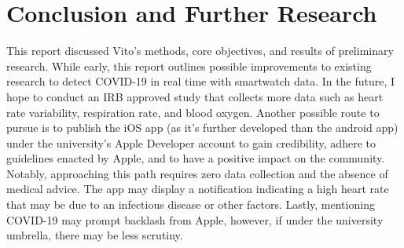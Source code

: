 \documentclass{article}
\newcommand\todo[1]{\textcolor{blue}{#1}}
\begin{document}

\section{Conclusion and Further Research}
 This report discussed Vito's methods, core objectives, and results of preliminary research.  While early, this report outlines possible improvements to existing research to detect COVID-19 in real time with smartwatch data.  In the future, I hope to conduct an IRB approved study that collects more data such as heart rate variability, respiration rate, and blood oxygen.  Another possible route to pursue is to publish the iOS app (as it's further developed than the android app) under the university's Apple Developer account to gain credibility, adhere to guidelines enacted by Apple, and to have a positive impact on the community.  Notably, approaching this path requires zero data collection and the absence of medical advice.  The app may display a notification indicating a high heart rate that may be due to an infectious disease or other factors.  Lastly, mentioning COVID-19 may prompt backlash from Apple, however, if under the university umbrella, there may be less scrutiny.
% 
\printbibliography
\end{document}
